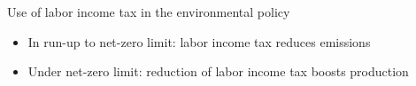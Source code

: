\documentclass[11pt,aspectratio=169]{beamer}
\begin{document}
\begin{frame}{Use of labor income tax in the environmental policy}
\begin{figure}[h!!]
\begin{subfigure}{0.45\textwidth}
		\end{subfigure}
	\end{figure}
	\vspace{3mm}
	\begin{block}{}
		\begin{itemize}
			\item In run-up to net-zero limit: labor income tax reduces emissions
			\item Under net-zero limit: reduction of labor income tax boosts production
		\end{itemize}
	\end{block}	
\end{frame}

\end{document}
